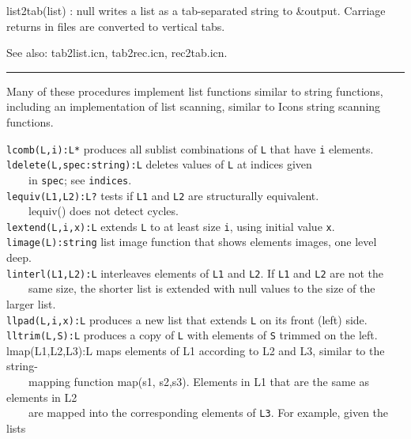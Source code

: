 \textsf{list2tab(list) : null} writes a list as a tab-separated string
to \textsf{\&output}. Carriage returns in files are converted to
vertical tabs.

See also: tab2list.icn, tab2rec.icn, rec2tab.icn. 

\vspace{0.25cm}\hrule{}

Many of these procedures implement list functions
similar to string functions, including an implementation of
list scanning, similar to Icon{\textquotesingle}s
string scanning functions.

\texttt{lcomb(L,i):L*} produces all sublist combinations of \texttt{L}
that have \texttt{i} elements.\\
\texttt{ldelete(L,spec:string):L} deletes values of \texttt{L} at
indices given\\
 \ \ \ \ in \texttt{spec}; see \texttt{indices}.\\
\texttt{lequiv(L1,L2):L?} tests if \texttt{L1} and \texttt{L2} are
structurally equivalent.\\
 \ \ \ \ lequiv() does not detect cycles.\\
\texttt{lextend(L,i,x):L} extends \texttt{L} to at least size
\texttt{i}, using initial value \texttt{x}.\\
\texttt{limage(L):string} list image function that shows
elements{\textquotesingle} images, one level deep.\\
\texttt{linterl(L1,L2):L} interleaves elements of \texttt{L1} and
\texttt{L2}. If \texttt{L1} and \texttt{L2} are not the\\
 \ \ \ \ same size, the shorter list is extended with null values to the
size of the larger list.\\
\texttt{llpad(L,i,x):L} produces a new list that extends \texttt{L} on
its front (left) side.\\
\texttt{lltrim(L,S):L} produces a copy of \texttt{L} with elements of
\texttt{S} trimmed on the left.\\
\textsf{lmap(L1,L2,L3):L} maps elements of \textsf{L1} according to
\textsf{L2} and \textsf{L3}, similar to the string-\\
 \ \ \ \ mapping function \textsf{map(s1, s2,s3)}. Elements in
\textsf{L1} that are the same as elements in \textsf{L2}\\
 \ \ \ \ are mapped into the corresponding elements of \texttt{L3}. For
example, given the lists\\
